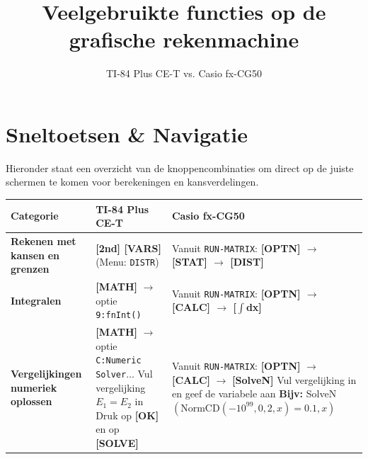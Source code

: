 \documentclass{article}
\begin{document}
\title{Veelgebruikte functies op de grafische rekenmachine}
\author{TI-84 Plus CE-T vs. Casio fx-CG50}
\date{}
\maketitle

    \section{Sneltoetsen \& Navigatie}

    Hieronder staat een overzicht van de knoppencombinaties om direct op de juiste schermen te komen voor berekeningen en kansverdelingen.

    \begin{table}[h]
    \centering
    \small
    \begin{tabularx}{\textwidth}{m{3.5cm} m{6.1cm} m{6.7cm}}%
    \toprule
    \textbf{Categorie} & \textbf{TI-84 Plus CE-T} & \textbf{Casio fx-CG50} \\
    \midrule
    \textbf{Rekenen met kansen} \newline \textbf{en grenzen} & 
    \textbf{[2nd] [VARS]} \newline (Menu: \texttt{DISTR}) & 
    Vanuit \texttt{RUN-MATRIX}: \newline \textbf{[OPTN] $\rightarrow$ [STAT] $\rightarrow$ [DIST]} \\
    \addlinespace
    \textbf{Integralen} & 
    \textbf{[MATH]} $\rightarrow$ optie \texttt{9:fnInt()} & 
    Vanuit \texttt{RUN-MATRIX}: \newline \textbf{[OPTN] $\rightarrow$ [CALC] $\rightarrow$ [$\int$dx]} \\
    \addlinespace
    \textbf{Vergelijkingen} \newline \textbf{numeriek oplossen} & 
    \textbf{[MATH]} $\rightarrow$ optie \texttt{C:Numeric Solver$\ldots$} \newline Vul vergelijking $E_1 = E_2$ in \newline Druk op \textbf{[OK]} en op \textbf{[SOLVE]} & 
    Vanuit \texttt{RUN-MATRIX}: \newline \textbf{[OPTN]} $\rightarrow$ \textbf{[CALC]} $\rightarrow$ \textbf{[SolveN]} \newline Vul vergelijking in en geef de variabele aan \newline \textbf{Bijv:} SolveN$\left(\text{NormCD}(-10^{99}, 0, 2, x) = 0.1, x\right)$
    \\

    \bottomrule
    \end{tabularx}
    \end{table}
\end{document}
